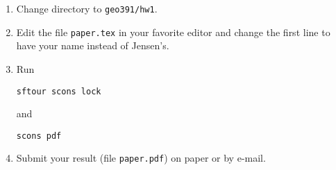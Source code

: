 \begin{enumerate}
\item Change directory to \verb#geo391/hw1#.
\item Edit the file \texttt{paper.tex} in your favorite editor and change the
first line to have your name instead of Jensen's.
\item Run
\begin{verbatim}
sftour scons lock
\end{verbatim}
and
\begin{verbatim}
scons pdf
\end{verbatim}
\item Submit your result (file \texttt{paper.pdf}) on paper or by
e-mail.
\end{enumerate}
